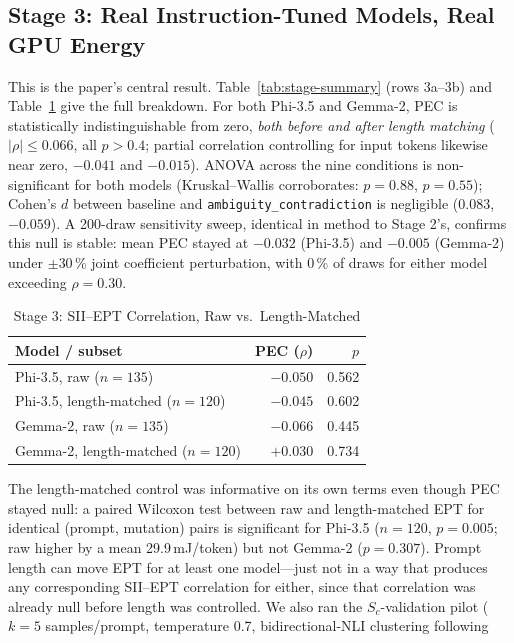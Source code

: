 \documentclass[conference]{IEEEtran}
\begin{document}
\subsection{Stage 3: Real Instruction-Tuned Models, Real GPU Energy}
\label{sec:results-stage3}
This is the paper's central result. Table~\ref{tab:stage-summary}
(rows 3a--3b) and Table~\ref{tab:real-pec} give the full breakdown.
For both Phi-3.5 and Gemma-2, PEC is statistically indistinguishable
from zero, \emph{both before and after length matching}
($|\rho|\le0.066$, all $p>0.4$; partial correlation controlling for
input tokens likewise near zero, $-0.041$ and $-0.015$). ANOVA across
the nine conditions is non-significant for both models
(Kruskal--Wallis corroborates: $p=0.88$, $p=0.55$); Cohen's $d$
between baseline and \texttt{ambiguity\_contradiction} is negligible
($0.083$, $-0.059$). A 200-draw sensitivity sweep, identical in method
to Stage 2's, confirms this null is stable: mean PEC stayed at
$-0.032$ (Phi-3.5) and $-0.005$ (Gemma-2) under $\pm30\,\%$ joint
coefficient perturbation, with 0\,\% of draws for either model
exceeding $\rho=0.30$.
\begin{table}[t]
\caption{Stage 3: SII--EPT Correlation, Raw vs.\ Length-Matched}
\label{tab:real-pec}
\centering
\setlength{\tabcolsep}{3pt}
\begin{tabular}{@{}lrr@{}}
\toprule
\textbf{Model / subset} & \textbf{PEC ($\rho$)} & \textbf{$p$} \\
\midrule
Phi-3.5, raw ($n=135$) & $-0.050$ & 0.562 \\
Phi-3.5, length-matched ($n=120$) & $-0.045$ & 0.602 \\
Gemma-2, raw ($n=135$) & $-0.066$ & 0.445 \\
Gemma-2, length-matched ($n=120$) & $+0.030$ & 0.734 \\
\bottomrule
\end{tabular}
\end{table}
The length-matched control was informative on its own terms even
though PEC stayed null: a paired Wilcoxon test between raw and
length-matched EPT for identical (prompt, mutation) pairs is
significant for Phi-3.5 ($n=120$, $p=0.005$; raw higher by a mean
29.9\,mJ/token) but not Gemma-2 ($p=0.307$). Prompt length can move
EPT for at least one model---just not in a way that produces any
corresponding SII--EPT correlation for either, since that correlation
was already null before length was controlled.
We also ran the $S_c$-validation pilot ($k=5$ samples/prompt,
temperature 0.7, bidirectional-NLI clustering following
\end{document}
